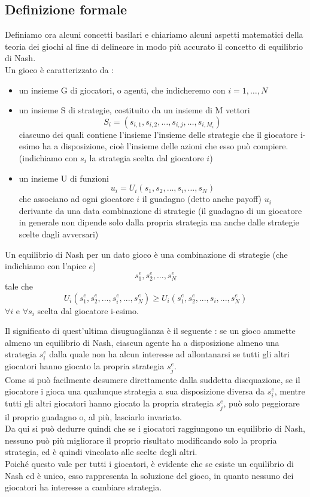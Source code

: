 \begin{flushleft}
\subsection{Definizione formale}
Definiamo ora alcuni concetti basilari e chiariamo alcuni aspetti matematici della teoria dei giochi al fine di delineare in modo più accurato il concetto di equilibrio di Nash.\\
Un gioco è caratterizzato da :
\begin{itemize}
	\item un insieme G di giocatori, o agenti, che indicheremo con \(i = 1,\ldots,N\)
	\item un insieme S di strategie, costituito da un insieme di M vettori \[S_{i}=\left(s_{{i,1}},s_{{i,2}},\ldots,s_{{i,j}},\ldots,s_{{i,M_{i}}}\right)\] ciascuno dei quali contiene l'insieme l'insieme delle strategie che il giocatore i-esimo ha a disposizione, cioè l'insieme delle azioni che esso può compiere.\\(indichiamo con \(s_i\) la strategia scelta dal giocatore \(i\))
	\item un insieme U di funzioni \[u_{i}=U_{i}\left(s_{1},s_{2},\ldots,s_{i},\ldots,s_{N}\right)\] che associano ad ogni giocatore \(i\) il guadagno (detto anche payoff) \(u_i\) derivante da una data combinazione di strategie (il guadagno di un giocatore in generale non dipende solo dalla propria strategia ma anche dalle strategie scelte dagli avversari)
\end{itemize}
Un equilibrio di Nash per un dato gioco è una combinazione di strategie (che indichiamo con l'apice \(e\))
\[s_{1}^{e},s_{2}^{e},...,s_{N}^{e}\]
tale che
\[U_{i}\left(s_{1}^{e},s_{2}^{e},...,s_{i}^{e},...,s_{N}^{e}\right)\geq U_{i}\left(s_{1}^{e},s_{2}^{e},...,s_{i},...,s_{N}^{e}\right)\]
\(\forall i\) e \(\forall s_i\) scelta dal giocatore i-esimo.\newline

Il significato di quest'ultima disuguaglianza è il seguente : se un gioco ammette almeno un equilibrio di Nash, ciascun agente ha a disposizione almeno una strategia \(s_i^e\) dalla quale non ha alcun interesse ad allontanarsi se tutti gli altri giocatori hanno giocato la propria strategia \(s_j^e\).\\
Come si può facilmente desumere direttamente dalla suddetta disequazione, se il giocatore i gioca una qualunque strategia a sua disposizione diversa da \(s_i^e\), mentre tutti gli altri giocatori hanno giocato la propria strategia \(s_j^e\), può solo peggiorare il proprio guadagno o, al più, lasciarlo invariato.\\
Da qui si può dedurre quindi che se i giocatori raggiungono un equilibrio di Nash, nessuno può più migliorare il proprio risultato modificando solo la propria strategia, ed è quindi vincolato alle scelte degli altri.\\
Poiché questo vale per tutti i giocatori, è evidente che se esiste un equilibrio di Nash ed è unico, esso rappresenta la soluzione del gioco, in quanto nessuno dei giocatori ha interesse a cambiare strategia.\newline


\end{flushleft}
